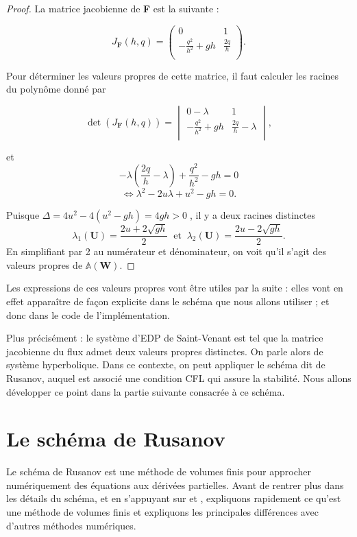 \documentclass[
11pt, %
francais, %
singlespacing, %
headsepline, %
f%
]{MastersDoctoralThesis} %
\theoremstyle{definition}
\begin{document}
\begin{proof}

La matrice jacobienne de \textbf{F} est la suivante :

$$J_{\textbf{F}}(h, q) =\begin{pmatrix}
   0 & 1  \\
   -\frac{q^{2}}{h^{2}}+gh & \frac{2q}{h}  \\
\end{pmatrix}.$$

Pour déterminer les valeurs propres de cette matrice, il faut calculer les racines du polynôme donné par

$$\det (J_{\textbf{F}}(h, q)) =\begin{vmatrix}
   0-\lambda & 1  \\
   -\frac{q^{2}}{h^{2}}+gh & \frac{2q}{h}-\lambda  \\
\end{vmatrix},$$

et $$-\lambda(\frac{2q}{h}-\lambda)+\frac{q^{2}}{h^{2}}-gh=0$$
$$\Leftrightarrow \lambda^{2}-2u\lambda+u^{2}-gh=0.$$

Puisque $\Delta=4u^{2}-4(u^{2}-gh)=4gh>0\phantom{.}$, il y a deux racines distinctes 
$$\lambda_{1}(\textbf{U})=\frac{2u+2\sqrt{gh}}{2} \phantom{..}\text{et}\phantom{..} \lambda_{2}(\textbf{U})=\frac{2u-2\sqrt{gh}}{2}.$$
En simplifiant par 2 au numérateur et dénominateur, on voit qu'il s'agit des valeurs propres de  $\mathbb{A}(\textbf{W}).$

\end{proof}

Les expressions de ces valeurs propres vont être utiles par la suite : elles vont en effet apparaître de fa\c con explicite dans le schéma que nous allons utiliser ; et donc dans le code de l'implémentation.

Plus précisément : le système d'EDP de Saint-Venant est tel que la matrice jacobienne du flux admet deux valeurs propres distinctes. On parle alors de système hyperbolique.
Dans ce contexte, on peut appliquer le schéma dit de Rusanov, auquel est associé une condition CFL qui assure la stabilité. Nous allons développer ce point dans la partie suivante consacrée à ce schéma.

\section{Le schéma de Rusanov}

Le schéma de Rusanov est une méthode de volumes finis pour approcher numériquement des équations aux dérivées partielles. Avant de rentrer plus dans les détails du schéma, et en s'appuyant sur \cite{RL} et \cite{W2} , expliquons rapidement ce qu'est une méthode de volumes finis et expliquons les principales différences avec d'autres méthodes numériques.
\end{document}
